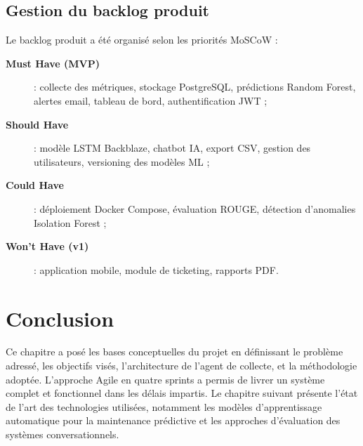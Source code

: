 \subsection{Gestion du backlog produit}

Le backlog produit a été organisé selon les priorités MoSCoW :

\begin{description}
  \item[\textbf{Must Have (MVP)}] : collecte des métriques, stockage PostgreSQL, prédictions
        Random Forest, alertes email, tableau de bord, authentification JWT ;
  \item[\textbf{Should Have}] : modèle LSTM Backblaze, chatbot IA, export CSV, gestion
        des utilisateurs, versioning des modèles ML ;
  \item[\textbf{Could Have}] : déploiement Docker Compose, évaluation ROUGE, détection
        d'anomalies Isolation Forest ;
  \item[\textbf{Won't Have (v1)}] : application mobile, module de ticketing, rapports PDF.
\end{description}

\section{Conclusion}

Ce chapitre a posé les bases conceptuelles du projet en définissant le problème adressé,
les objectifs visés, l'architecture de l'agent de collecte, et la méthodologie adoptée.
L'approche Agile en quatre sprints a permis de livrer un système complet et fonctionnel
dans les délais impartis. Le chapitre suivant présente l'état de l'art des technologies
utilisées, notamment les modèles d'apprentissage automatique pour la maintenance prédictive
et les approches d'évaluation des systèmes conversationnels.
